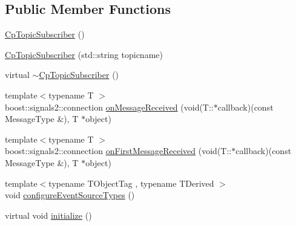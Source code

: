 \subsection*{Public Member Functions}
\begin{DoxyCompactItemize}
\item 
\hyperlink{classsmacc_1_1components_1_1CpTopicSubscriber_aeb25b3a5d149c6256e35bc4049cc0b6f}{Cp\+Topic\+Subscriber} ()
\item 
\hyperlink{classsmacc_1_1components_1_1CpTopicSubscriber_a331fb12e76c4c9e26f88a6cbb5c6f8cd}{Cp\+Topic\+Subscriber} (std\+::string topicname)
\item 
virtual \hyperlink{classsmacc_1_1components_1_1CpTopicSubscriber_a82118e72ea660b4f651dd02f8caf51a5}{$\sim$\+Cp\+Topic\+Subscriber} ()
\item 
{\footnotesize template$<$typename T $>$ }\\boost\+::signals2\+::connection \hyperlink{classsmacc_1_1components_1_1CpTopicSubscriber_af8f626a4ef4aa6ff699359f136372292}{on\+Message\+Received} (void(T\+::$\ast$callback)(const Message\+Type \&), T $\ast$object)
\item 
{\footnotesize template$<$typename T $>$ }\\boost\+::signals2\+::connection \hyperlink{classsmacc_1_1components_1_1CpTopicSubscriber_ac7b226871cec5c4358cc635e02f56bf2}{on\+First\+Message\+Received} (void(T\+::$\ast$callback)(const Message\+Type \&), T $\ast$object)
\item 
{\footnotesize template$<$typename T\+Object\+Tag , typename T\+Derived $>$ }\\void \hyperlink{classsmacc_1_1components_1_1CpTopicSubscriber_a20946cb2d50ea4d1bda2a5331940af33}{configure\+Event\+Source\+Types} ()
\item 
virtual void \hyperlink{classsmacc_1_1components_1_1CpTopicSubscriber_a12a86f96d939cfa509181865d6ec85e9}{initialize} ()
\end{DoxyCompactItemize}
